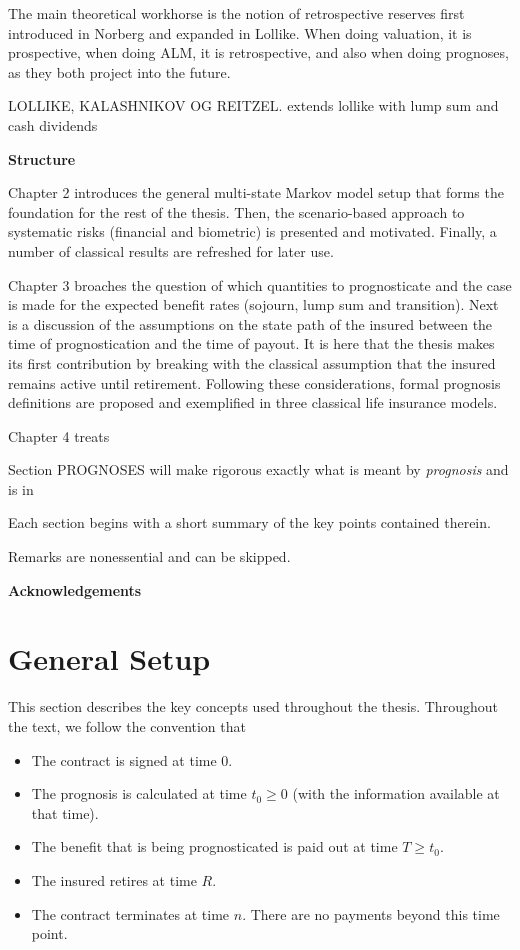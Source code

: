 \documentclass{book}
\newcommand{\1}[1]{\mathbbm{1}_{\left\lbrace #1 \right\rbrace}}
\theoremstyle{break}
\theoremstyle{remark}
\numberwithin{equation}{section}
\begin{document}
The main theoretical workhorse is the notion of retrospective reserves first introduced in Norberg and expanded in Lollike. When doing valuation, it is prospective, when doing ALM, it is retrospective, and also when doing prognoses, as they both project into the future.

LOLLIKE, KALASHNIKOV OG REITZEL. extends lollike with lump sum and cash dividends

\textbf{Structure}

Chapter 2 introduces the general multi-state Markov model setup that forms the foundation for the rest of the thesis. Then, the scenario-based approach to systematic risks (financial and biometric) is presented and motivated. Finally, a number of classical results are refreshed for later use.

Chapter 3 broaches the question of which quantities to prognosticate and the case is made for the expected benefit rates (sojourn, lump sum and transition). Next is a discussion of the assumptions on the state path of the insured between the time of prognostication and the time of payout. It is here that the thesis makes its first contribution by breaking with the classical assumption that the insured remains active until retirement. Following these considerations, formal prognosis definitions are proposed and exemplified in three classical life insurance models.

Chapter 4 treats 

Section PROGNOSES will make rigorous exactly what is meant by \textit{prognosis} and is in

Each section begins with a short summary of the key points contained therein.

Remarks are nonessential and can be skipped.

\textbf{Acknowledgements}

\newpage

\chapter{General Setup}

This section describes the key concepts used throughout the thesis. Throughout the text, we follow the convention that 

\begin{itemize}
	\item The contract is signed at time $0$.
	\item The prognosis is calculated at time $t_0 \geq 0$ (with the information available at that time).
	\item The benefit that is being prognosticated is paid out at time $T \geq t_0$.
	\item The insured retires at time $R$.
	\item The contract terminates at time $n$. There are no payments beyond this time point.
\end{itemize}
\end{document}
